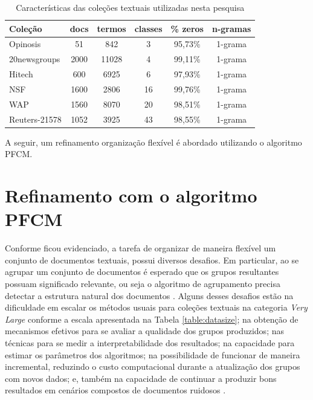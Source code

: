 \begin{table}[!htp]
  \centering
  \begin{tabular}{ |l|c c c c c|}
    \hline
    {\bf Coleção} & {\bf docs} & {\bf termos} & {\bf classes} & {\bf \% zeros} & {\bf n-gramas} \\
    \hline
    Opinosis & 51 & 842 & 3 & 95,73\% & 1-grama \\
    \hline
    20newsgroups & 2000 & 11028 & 4 & 99,11\% & 1-grama \\
    \hline
    Hitech & 600 & 6925 & 6 & 97,93\% & 1-grama \\
    \hline
    NSF & 1600 & 2806 & 16 & 99,76\% & 1-grama \\
    \hline
    WAP & 1560 & 8070 & 20 & 98,51\% & 1-grama \\
    \hline
    Reuters-21578 & 1052 & 3925 & 43 & 98,55\% & 1-grama \\
    \hline
  \end{tabular}
  \caption{Características das coleções textuais utilizadas nesta pesquisa}
  \label{table:datasets}
\end{table}

A seguir, um refinamento organização flexível é abordado utilizando o algoritmo PFCM.

\section{Refinamento com o algoritmo PFCM}
\label{sec:exppfcm}

Conforme ficou evidenciado, a tarefa de organizar de maneira flexível um conjunto de documentos
textuais, possui diversos desafios. Em particular, ao se agrupar um conjunto de documentos é
esperado que os grupos resultantes possuam significado relevante, ou seja o algoritmo de
agrupamento precisa detectar a estrutura natural dos documentos \cite{Steinbach2004}. Alguns desses 
desafios estão na dificuldade em escalar os métodos usuais para coleções textuais na categoria {\it Very Large}
conforme a escala apresentada na Tabela \ref{table:datasize}; na obtenção de
mecanismos efetivos para se avaliar a qualidade dos grupos produzidos; nas técnicas para se medir a
interpretabilidade dos resultados; na capacidade para estimar os parâmetros dos algoritmos;
na possibilidade de funcionar de maneira incremental, reduzindo o custo computacional durante a
atualização dos grupos com novos dados; e, também na capacidade de continuar a produzir bons
resultados em cenários compostos de documentos ruidosos \cite{Carvalho2016}. 

